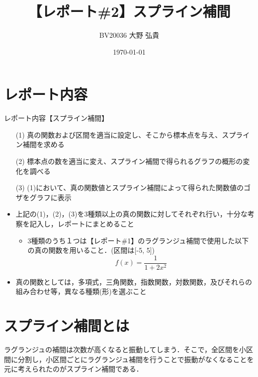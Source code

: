 \documentclass[titlepage, a4paper, 11pt, dvipdfmx]{jsarticle}
\title{\Huge【レポート\#2】スプライン補間}%
\date{\today}%
\author{\Large BV20036 \quad 大野 弘貴}%
\begin{document}
\maketitle
{}
\newpage
{}


\section{レポート内容}
\begin{itembox}[l]{レポート内容【スプライン補間】}
    \begin{itemize}
      \item[(1)]真の関数および区間を適当に設定し、そこから標本点を与え、スプライン補間を求める
      \item[(2)]標本点の数を適当に変え、スプライン補間で得られるグラフの概形の変化を調べる
      \item[(3)](1)において、真の関数値とスプライン補間によって得られた関数値のゴザをグラフに表示  
        \item 上記の(1)，(2)，(3)を3種類以上の真の関数に対してそれぞれ行い，十分な考察を記入し，レポートにまとめること

        \begin{itemize}
            \item 3種類のうち１つは【レポート\#1】のラグランジュ補間で使用した以下の真の関数を用いること．(区間は[-5, 5])
        $$ f(x)=\frac{1}{1+2x^2} $$
        \end{itemize} 
        \item 真の関数としては，多項式，三角関数，指数関数，対数関数，及びそれらの組み合わせ等，異なる種類(形)を選ぶこと
  \end{itemize}
\end{itembox}
\section{スプライン補間とは}
ラグランジュの補間は次数が高くなると振動してしまう．そこで，全区間を小区間に分割し，小区間ごとにラグランジュ補間を行うことで振動がなくなることを元に考えられたのがスプライン補間である．
\end{document}
